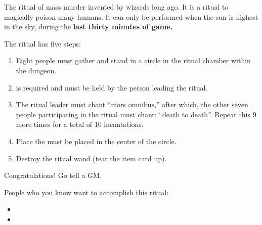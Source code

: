 \documentclass[green]{guildcamp2}
\begin{document}
\name{\gKillRitual{}}
The ritual of mass murder invented by wizards long ago. It is a ritual to magically poison many humans. It can only be performed when the sun is highest in the sky, during the {\bf last thirty minutes of game.}

The ritual has five steps: 
\begin{enumerate}
\item Eight people must gather and stand in a circle in the ritual chamber within the dungeon.
\item \iRitualWand{} is required and must be held by the person leading the ritual.
\item The ritual leader must chant ``mors omnibus,'' after which, the other seven people participating in the ritual must chant: ``death to death''. Repeat this 9 more times for a total of 10 incantations.
\item Place the \iReaperIdol{} must be placed in the center of the circle.
\item Destroy the ritual wand (tear the item card up).
\end{enumerate}

Congratulations! Go tell a GM.




People who you know want to accomplish this ritual:
\begin{itemize}
\item \cRed{}
\item \cLich{}
\end{itemize}
      
\end{document}
